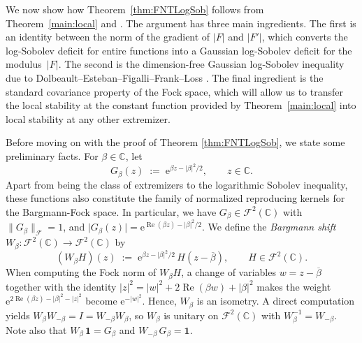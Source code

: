 \documentclass[11pt]{amsart}
\theoremstyle{remark}
\newcommand{\C}{\mathbb{C}}
\newcommand{\abs}[1]{\lvert #1 \rvert}
\newcommand{\norm}[1]{\lVert #1 \rVert}
\newcommand{\ee}{\mathrm{e}}
\begin{document}
We now show how Theorem~\ref{thm:FNTLogSob} follows from
Theorem~\ref{main:local} and
\cite[Corollary~1.2]{DolbeaultEstebanFigalliFrankLoss2025}.  The argument
has three main ingredients. The first is an identity between the norm of the gradient of $|F|$ and $|F'|$,
which converts the log-Sobolev deficit for entire functions into a Gaussian
log-Sobolev deficit for the modulus~$\abs{F}$. The second is the dimension-free
 Gaussian log-Sobolev inequality due to
Dolbeault--Esteban--Figalli--Frank--Loss \cite{DolbeaultEstebanFigalliFrankLoss2025}. The final ingredient is the standard covariance property of the
Fock space, which will allow us to transfer the local stability at
the constant function provided by Theorem~\ref{main:local} into local stability at any other extremizer. 
\medskip

Before moving on with the proof of Theorem \ref{thm:FNTLogSob}, we state some preliminary facts. 
For $\beta \in \C$, let
\[
G_\beta(z) \;:=\; \ee^{\beta z - \abs{\beta}^2/2},
\qquad z \in \C.
\]
Apart from being the class of extremizers to the logarithmic Sobolev inequality, these functions also constitute the family of normalized reproducing kernels for the Bargmann-Fock space. In particular, we have $G_\beta \in \mathcal{F}^2(\C)$ with $\norm{G_\beta}_{\mathcal{F}} = 1$,
and $\abs{G_\beta(z)}
= \ee^{\operatorname{Re}(\beta z) - \abs{\beta}^2/2}$.
We define the \emph{Bargmann shift}
$W_\beta : \mathcal{F}^2(\C) \to \mathcal{F}^2(\C)$ by
\[
(W_\beta H)(z)
\;:=\; \ee^{\beta z - \abs{\beta}^2/2}\, H(z - \overline{\beta}),
\qquad H \in \mathcal{F}^2(\C).
\]
When computing the Fock norm of $W_\beta H$, a change of variables $w = z - \overline{\beta}$ 
together with the identity
$\abs{z}^2 = \abs{w}^2 + 2\operatorname{Re}(\beta w) + \abs{\beta}^2$
makes the weight
$\ee^{2 \operatorname{Re}(\beta z) - \abs{\beta}^2 - \abs{z}^2}$
become $\ee^{-\abs{w}^2}$. Hence, $W_{\beta}$ is an isometry.  A direct
computation yields $W_\beta W_{-\beta} = I = W_{-\beta} W_\beta$, so $W_\beta$
is unitary on $\mathcal{F}^2(\C)$ with $W_\beta^{-1} = W_{-\beta}$.
Note also that $W_\beta\, \mathbf{1} = G_\beta$ and
$W_{-\beta}\, G_\beta = \mathbf{1}$.
\medskip
\end{document}
